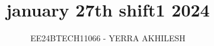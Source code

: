 \documentclass[journal]{IEEEtran}
\begin{document}

\vspace{3cm}

\title{january 27th shift1 2024}
\author{EE24BTECH11066 - YERRA AKHILESH
}
{\let\newpage\relax\maketitle}

\renewcommand{\thefigure}{\theenumi}
\renewcommand{\thetable}{\theenumi}
\setlength{\intextsep}{10pt} %


\renewcommand{\thetable}{\theenumi}
\end{document}
